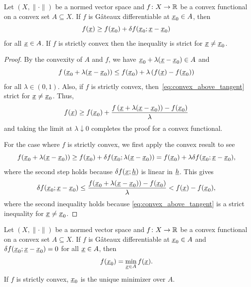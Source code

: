 \begin{theorem}
\label{theorem:convex_above_tangent}
Let $(X,\|\cdot\|)$ be a normed vector space and $f \colon X \rightarrow \mathbb{R}$ be a convex functional on a convex set $A \subseteq X$.
If $f$ is G\^{a}teaux differentiable at $\underline{x}_0 \in A$, then
\[ f(\underline{x}) \geq f(\underline{x}_0) + \delta f (\underline{x}_0;\underline{x}-\underline{x}_0) \]
for all $\underline{x}\in A$.
If $f$ is strictly convex then the inequality is strict for $\underline{x}\neq \underline{x}_0$.
\end{theorem}
\begin{proof}
By the convexity of $A$ and $f$, we have $\underline{x}_0 + \lambda (\underline{x}- \underline{x}_0) \in A$ and
\begin{equation} \label{eq:convex_above_tangent}
f \left(\underline{x}_0 + \lambda (\underline{x}-\underline{x}_0) \right) \leq f(\underline{x}_0) + \lambda \left( f(\underline{x}) - f(\underline{x}_0) \right)
\end{equation}
for all $\lambda\in (0,1)$.
Also, if $f$ is strictly convex, then~\eqref{eq:convex_above_tangent} strict for $\underline{x} \neq \underline{x}_0$.
Thus,
\[  f(\underline{x}) \geq f(\underline{x}_0) + \frac{f \left(\underline{x} + \lambda (\underline{x}-\underline{x}_0) \right)- f(\underline{x}_0)}{\lambda} \]
and taking the limit at $\lambda \downarrow 0$ completes the proof for a convex functional.

For the case where $f$ is strictly convex, we first apply the convex result to see
\[ f(\underline{x}_0 + \lambda(\underline{x}- \underline{x}_0)) \geq f(\underline{x}_0) + \delta f (\underline{x}_0;\lambda(\underline{x}-\underline{x}_0)) = f(\underline{x}_0) + \lambda \delta f (\underline{x}_0;\underline{x}-\underline{x}_0), \]
where the second step holds because $\delta f (\underline{x};\underline{h})$ is linear in $\underline{h}$.
This gives
\[ \delta f (\underline{x}_0;\underline{x}-\underline{x}_0)
\leq \frac{f(\underline{x}_0 + \lambda(\underline{x}- \underline{x}_0)) - f(\underline{x}_0)}{\lambda}
< f(\underline{x}) - f(\underline{x}_0), \]
where the second inequality holds because \eqref{eq:convex_above_tangent} is a strict inequality for $\underline{x} \neq \underline{x}_0$.
\end{proof}

\begin{corollary}
Let $(X,\|\cdot\|)$ be a normed vector space and $f \colon X \rightarrow \mathbb{R}$ be a convex functional on a convex set $A \subseteq X$.
If $f$ is G\^{a}teaux differentiable at $\underline{x}_0 \in A$ and $\delta f (\underline{x}_0;\underline{x}-\underline{x}_0) = 0$ for all $\underline{x} \in A$, then
\[ f(\underline{x}_0) = \min_{\underline{x}\in A} f(\underline{x}). \]
If $f$ is strictly convex, $\underline{x}_0$ is the unique minimizer over $A$.
\end{corollary}

